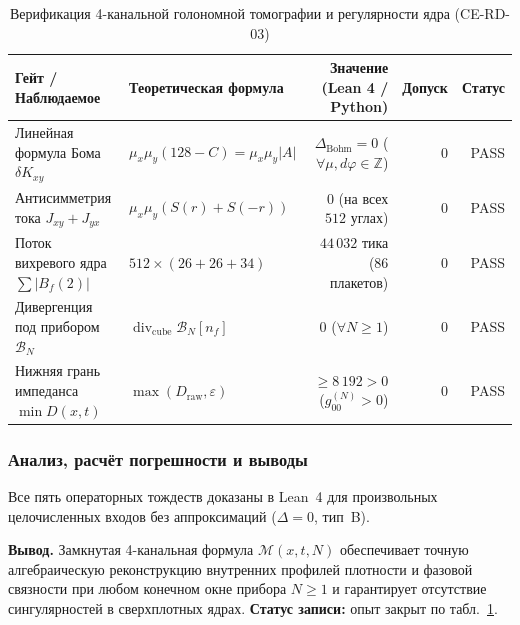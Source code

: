 \begin{table}[htbp]
\centering
\footnotesize
\setlength{\tabcolsep}{4pt}
\caption{Верификация 4-канальной голономной томографии и регулярности ядра (CE-RD-03)}
\label{tab:exp-ce-rd-03}
\begin{tabular}{@{}llrrr@{}}
\toprule
Гейт / Наблюдаемое & Теоретическая формула & Значение (Lean 4 / Python) & Допуск & Статус \\
\midrule
Линейная формула Бома $\delta K_{xy}$ & $\mu_x\mu_y(128 - C) = \mu_x\mu_y|A|$ & $\Delta_{\mathrm{Bohm}} = 0$ ($\forall\mu,d\varphi\in\mathbb{Z}$) & $0$ & PASS \\
Антисимметрия тока $J_{xy}+J_{yx}$ & $\mu_x\mu_y(S(r)+S(-r))$ & $0$ (на всех $512$ углах) & $0$ & PASS \\
Поток вихревого ядра $\sum |B_f(2)|$ & $512\times(26+26+34)$ & $44\,032$ тика ($86$ плакетов) & $0$ & PASS \\
Дивергенция под прибором $\mathcal{B}_N$ & $\operatorname{div}_{\mathrm{cube}}\mathcal{B}_N[n_f]$ & $0$ ($\forall N\ge 1$) & $0$ & PASS \\
Нижняя грань импеданса $\min D(x,t)$ & $\max(D_{\mathrm{raw}}, \varepsilon)$ & $\ge 8\,192 > 0$ ($g_{00}^{(N)} > 0$) & $0$ & PASS \\
\bottomrule
\end{tabular}
\end{table}

\subsubsection*{Анализ, расчёт погрешности и выводы}
Все пять операторных тождеств доказаны в Lean~4 для произвольных целочисленных входов без аппроксимаций ($\Delta = 0$, тип~B).

\textbf{Вывод.}
Замкнутая 4-канальная формула $\mathcal{M}(x,t,N)$ обеспечивает точную алгебраическую реконструкцию внутренних профилей плотности и фазовой связности при любом конечном окне прибора $N\ge 1$ и гарантирует отсутствие сингулярностей в сверхплотных ядрах.
\textbf{Статус записи:} опыт закрыт по табл.~\ref{tab:exp-ce-rd-03}.
